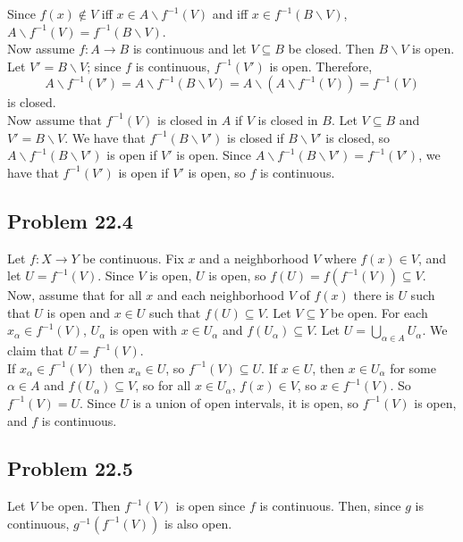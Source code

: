 \documentclass{article}
\newcommand{\minus}{\backslash}
\begin{document}
Since $f(x) \not\in V$ iff $x \in A \minus f^{-1}(V)$ and iff $x \in f^{-1}(B \minus V)$, $A \minus f^{-1}(V) = f^{-1}(B \minus V)$. \\

Now assume $f: A\to B$ is continuous and let $V \subseteq B$ be closed. Then $B \minus V$ is open. Let $V' = B \minus V$; since $f$ is continuous, $f^{-1}(V')$ is open. Therefore,
$$A \minus f^{-1}(V') = A \minus f^{-1}(B \minus V) = A \minus (A \minus f^{-1}(V)) = f^{-1}(V)$$
is closed. \\

Now assume that $f^{-1}(V)$ is closed in $A$ if $V$ is closed in $B$. Let $V \subseteq B$ and $V' = B \minus V$. We have that $f^{-1}(B \minus V')$ is closed if $B \minus V'$ is closed, so $A \minus f^{-1}(B \minus V')$ is open if $V'$ is open. Since $A \minus f^{-1}(B \minus V') = f^{-1}(V')$, we have that $f^{-1}(V')$ is open if $V'$ is open, so $f$ is continuous.

\subsection*{Problem 22.4}
Let $f: X\to Y$ be continuous. Fix $x$ and a neighborhood $V$ where $f(x) \in V$, and let $U = f^{-1}(V)$. Since $V$ is open, $U$ is open, so $f(U) = f(f^{-1}(V)) \subseteq V$. \\

Now, assume that for all $x$ and each neighborhood $V$ of $f(x)$ there is $U$ such that $U$ is open and $x \in U$ such that $f(U) \subseteq V$. Let $V \subseteq Y$ be open. For each $x_\alpha \in f^{-1}(V)$, $U_\alpha$ is open with $x \in U_\alpha$ and $f(U_\alpha) \subseteq V$. Let $U = \bigcup_{\alpha \in A} U_\alpha$. We claim that $U = f^{-1}(V)$. \\

If $x_\alpha \in f^{-1}(V)$ then $x_\alpha \in U$, so $f^{-1}(V) \subseteq U$. If $x \in U$, then $x \in U_\alpha$ for some $\alpha \in A$ and $f(U_\alpha) \subseteq V$, so for all $x \in U_\alpha$, $f(x) \in V$, so $x \in f^{-1}(V)$. So $f^{-1}(V) = U$. Since $U$ is a union of open intervals, it is open, so $f^{-1}(V)$ is open, and $f$ is continuous.

\subsection*{Problem 22.5}
Let $V$ be open. Then $f^{-1}(V)$ is open since $f$ is continuous. Then, since $g$ is continuous, $g^{-1}(f^{-1}(V))$ is also open.
\end{document}
